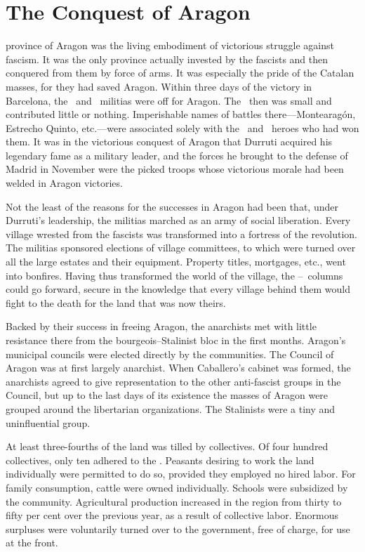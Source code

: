 \chapter{The Conquest of Aragon}

 province of Aragon was the living embodiment of victorious struggle against fascism. It was the only province actually invested by the fascists and then conquered from them by force of arms. It was especially the pride of the Catalan masses, for they had saved Aragon. Within three days of the victory in Barcelona, the \CNT\ and \POUM\ militias were off for Aragon. The \PSUC\ then was small and contributed little or nothing. Imperishable names of battles there---Montearagón, Estrecho Quinto, etc.---were associated solely with the \CNT\ and \POUM\ heroes who had won them. It was in the victorious conquest of Aragon that Durruti acquired his legendary fame as a military leader, and the forces he brought to the defense of Madrid in November were the picked troops whose victorious morale had been welded in Aragon victories.

Not the least of the reasons for the successes in Aragon had been that, under Durruti’s leadership, the militias marched as an army of social liberation. Every village wrested from the fascists was transformed into a fortress of the revolution. The militias sponsored elections of village committees, to which were turned over all the large estates and their equipment. Property titles, mortgages, etc., went into bonfires. Having thus transformed the world of the village, the \CNT--\POUM\ columns could go forward, secure in the knowledge that every village behind them would fight to the death for the land that was now theirs.

Backed by their success in freeing Aragon, the anarchists met with little resistance there from the bourgeois--Stalinist bloc in the first months. Aragon’s municipal councils were elected directly by the communities. The Council of Aragon was at first largely anarchist. When Caballero’s cabinet was formed, the anarchists agreed to give representation to the other anti-fascist groups in the Council, but up to the last days of its existence the masses of Aragon were grouped around the libertarian organizations. The Stalinists were a tiny and uninfluential group.

At least three-fourths of the land was tilled by collectives. Of four hundred collectives, only ten adhered to the \UGT. Peasants desiring to work the land individually were permitted to do so, provided they employed no hired labor. For family consumption, cattle were owned individually. Schools were subsidized by the community. Agricultural production increased in the region from thirty to fifty per cent over the previous year, as a result of collective labor. Enormous surpluses were voluntarily turned over to the government, free of charge, for use at the front.

